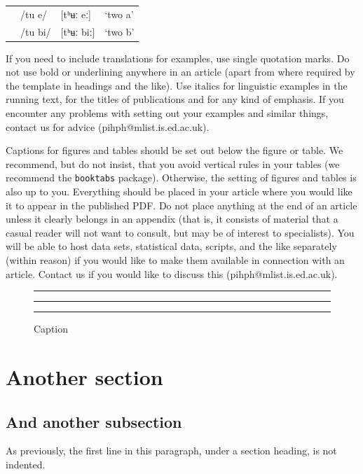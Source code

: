 \documentclass[article, a4paper, 12pt]{memoir}
\begin{document}
\ex{}\begin{tabular}[t]{>{\tl}llll} %
& /tu e/ & [tʰʉː eː] & `two a' \\
& /tu bi/ & [tʰʉː biː] & `two b'
\end{tabular}
\xe 

If you need to include translations for examples, use single quotation marks. Do not use bold or underlining anywhere in an article (apart from where required by the template in headings and the like). Use italics for linguistic examples in the running text, for the titles of publications and for any kind of emphasis. If you encounter any problems with setting out your examples and similar things, contact us for advice (pihph@\hspace{0pt}mlist.is.ed.ac.uk).

Captions for figures and tables should be set out below the figure or table. We recommend, but do not insist, that you avoid vertical rules in your tables (we recommend the \texttt{booktabs} package). Otherwise, the setting of figures and tables is also up to you. Everything should be placed in your article where you would like it to appear in the published PDF. Do not place anything at the end of an article unless it clearly belongs in an appendix (that is, it consists of material that a casual reader will not want to consult, but may be of interest to specialists). You will be able to host data sets, statistical data, scripts, and the like separately (within reason) if you would like to make them available in connection with an article. Contact us if you would like to discuss this (pihph@\hspace{0pt}mlist.is.ed.ac.uk).

\begin{figure}[h]
  \centering
  \rule{.1pt}{2cm} \rule{2cm}{.1pt} \rule{.1pt}{2cm}
  \caption{Caption}
  \label{fig:example}
\end{figure}

\section{Another section}
\label{sec:another-section}

\subsection{And another subsection}
\label{sec:another-subsection}

As previously, the first line in this paragraph, under a section heading, is not indented. 
\end{document}
